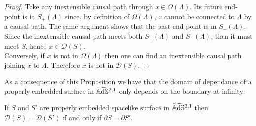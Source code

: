 \begin{proof}
    Take any inextensible causal path through $x\in \Omega(\Lambda)$. Its future end-point is in $S_+(\Lambda)$ since, by definition of $\Omega(\Lambda)$, $x$ cannot be connected to $\Lambda$ by a causal path. The same argument shows that the past end-point is in $S_-(\Lambda)$. Since the inextensible causal path meets both $S_+(\Lambda)$ and $S_-(\Lambda)$, then it must meet $S$, hence $x\in \mathcal{D}(S)$.\\
    Conversely, if $x$ is not in $\Omega(\Lambda)$ then one can find an inextensible causal path joining $x$ to $\Lambda$. Therefore $x$ is not in $\mathcal{D}(S)$.
\end{proof}
As a consequence of this Proposition we have that the domain of dependance of a properly embedded surface in $\widetilde{\mathbb{A}\mathrm{d}\mathbb{S}}{}^{2,1}$ only depends on the boundary at infinity:
\begin{corollary}
    If $S$ and $S'$ are properly embedded spacelike surface in $\widetilde{\mathbb{A}\mathrm{d}\mathbb{S}}{}^{2,1}$ then $\mathcal{D}(S) = \mathcal{D}(S')$ if and only if $\partial S = \partial S'$.
\end{corollary}

